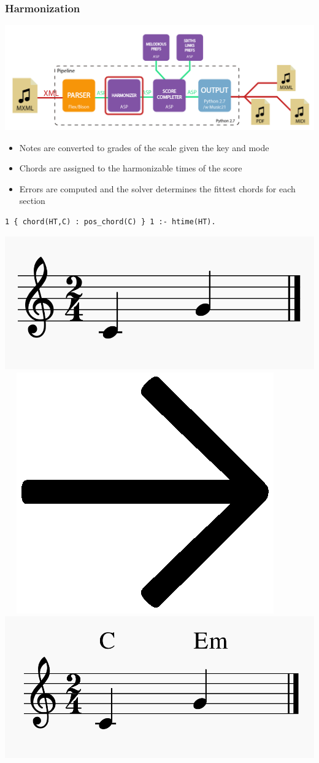 \documentclass[english]{beamer}
\begin{document}
	\begin{frame}[t,fragile]
	\frametitle{Harmonization}
	\begin{center}
			\includegraphics[width=0.6\linewidth]{imagenes/arch_trans/arquitectura_final_asp_harm-01.png}
	\end{center}
	\begin{itemize}
		\item Notes are converted to \alert{grades of the scale} given the \alert{key} and \alert{mode}
		\item \alert{Chords} are assigned to the harmonizable times of the score
		\item \alert{Errors} are computed and the solver determines the \alert{fittest chords} for each section
	\end{itemize}
	\pause
	\begin{Verbatim}[frame=single]
    1 { chord(HT,C) : pos_chord(C) } 1 :- htime(HT).
	\end{Verbatim}
	\begin{center}
			\includegraphics[width=0.25\linewidth,valign=c]{imagenes/example_notes.png}~~
			\includegraphics[width=0.04\linewidth,valign=c]{imagenes/arrow.png}~~
			\includegraphics[width=0.25\linewidth,valign=c]{imagenes/harmonized_example.png}
	\end{center}

	\end{frame}
\end{document}
